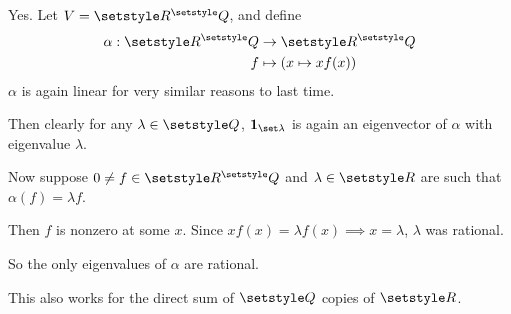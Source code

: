\documentclass[fleqn,a4paper,11pt]{article}
\begin{document}
\begin{itemize}
  Yes. Let \(V = \R^\Q\), and define
  \begin{align*}
   \alpha: \R^\Q &\to \R^\Q \\
               f &\mapsto (x \mapsto x f(x))
  \end{align*}
  \(\alpha\) is again linear for very similar reasons to last time.

  Then clearly for any \(\lambda \in \Q\), \(\mathbf 1_{\set \lambda}\) is again
  an eigenvector of \(\alpha\) with eigenvalue \(\lambda\).

  Now suppose \(0 \ne f \in \R^\Q\) and \(\lambda \in \R\) are such that
  \(\alpha(f) = \lambda f\).

  Then \(f\) is nonzero at some \(x\). Since
  \(x f(x) = \lambda f(x) \implies x = \lambda\),
  \(\lambda\) was rational.

  So the only eigenvalues of \(\alpha\) are rational.

  This also works for the direct sum of \(\Q\) copies of \(\R\).
\end{itemize}
\end{document}
